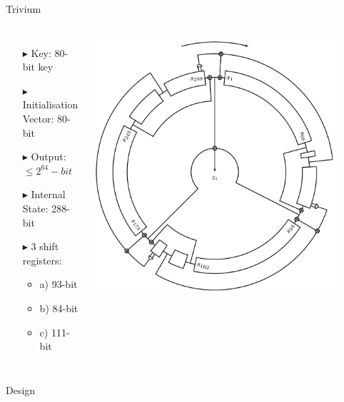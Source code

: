 \documentclass[10pt, compress]{beamer}
\begin{document}
\begin{frame}{Trivium}
\begin{columns}
\begin{itemize}[itemsep=0.5cm]
\item[$\blacktriangleright$] Key: 80-bit key
\item[$\blacktriangleright$] Initialisation Vector: 80-bit
\item[$\blacktriangleright$] Output: $\leq2^{64}-bit$
\item[$\blacktriangleright$] Internal State: 288-bit
\item[$\blacktriangleright$] 3 shift registers:
\begin{itemize}
\item a) 93-bit
\item b) 84-bit
\item c) 111-bit
\end{itemize}
\end{itemize}
\includegraphics[width=0.9\textwidth]{figures/round.png}\cite{circle}
\end{columns}
\end{frame}

\begin{frame}{Design}
\begin{figure}

\end{figure}
\end{frame}
\end{document}
